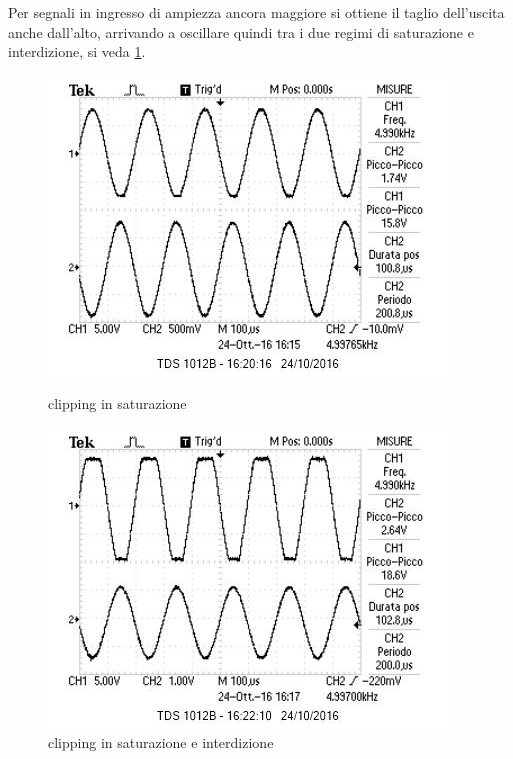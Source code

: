 \documentclass[10pt,a4paper]{article}
\begin{document}
Per segnali in ingresso di ampiezza ancora maggiore si ottiene il taglio dell'uscita anche dall'alto, arrivando a oscillare quindi tra i due regimi di saturazione e interdizione, si veda \figurename{\ref{fig:clippingdoppio}}.
\begin{figure}[h!]
	\centering
	\begin{minipage}[c]{0.49\textwidth}
	\centering
	\includegraphics[width=\textwidth]{../oscilloscopio/firstclipbasso.jpg}
	\caption{clipping in saturazione}
	\label{fig:clipping}
	\end{minipage}
	\begin{minipage}[c]{0.49\textwidth}
	\centering
	\includegraphics[width=\textwidth]{../oscilloscopio/clipall.jpg}
	\caption{clipping in saturazione e interdizione}
	\label{fig:clippingdoppio}
	\end{minipage}
\end{figure}
\end{document}
